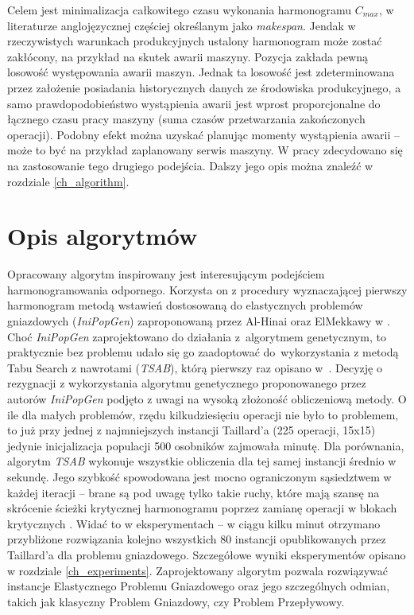 \documentclass[archivemode]{mgr}
\begin{document}
Celem jest minimalizacja całkowitego czasu wykonania harmonogramu $C_{max}$, w literaturze anglojęzycznej częściej określanym jako \emph{makespan}. Jendak w rzeczywistych warunkach produkcyjnych ustalony harmonogram może zostać zakłócony, na przykład na skutek awarii maszyny. Pozycja \cite{RFJSRMB_ElMekkawy11} zakłada pewną losowość występowania awarii maszyn. Jednak ta losowość jest zdeterminowana przez założenie posiadania historycznych danych ze środowiska produkcyjnego, a samo prawdopodobieństwo wystąpienia awarii jest wprost proporcjonalne do łącznego czasu pracy maszyny (suma czasów przetwarzania zakończonych operacji). Podobny efekt można uzyskać planując momenty wystąpienia awarii -- może to być na przykład zaplanowany serwis maszyny. W pracy zdecydowano się na zastosowanie tego drugiego podejścia. Dalszy jego opis można znaleźć w rozdziale \ref{ch_algorithm}.
%
\chapter{Opis algorytmów \label{ch_algorithm}}
Opracowany algorytm inspirowany jest interesującym podejściem harmonogramowania odpornego. Korzysta on z procedury wyznaczającej pierwszy harmonogram metodą wstawień dostosowaną do elastycznych problemów gniazdowych (\emph{IniPopGen}) zaproponowaną przez Al-Hinai oraz ElMekkawy w \cite{AEHGAFJS_ElMekkawy11}. Choć \emph{IniPopGen} zaprojektowano do działania z~algorytmem genetycznym, to praktycznie bez problemu udało się go zaadoptować do~wykorzystania z metodą Tabu Search z nawrotami (\emph{TSAB}), którą pierwszy raz opisano w~\cite{Smutnicki96}. Decyzję o rezygnacji z wykorzystania algorytmu genetycznego proponowanego przez autorów \emph{IniPopGen} podjęto z uwagi na wysoką złożoność obliczeniową metody. O ile dla małych problemów, rzędu kilkudziesięciu operacji nie było to problemem, to już przy jednej z najmniejszych instancji Taillard'a (225 operacji, 15x15) jedynie inicjalizacja populacji 500 osobników zajmowała minutę. Dla porównania, algorytm \emph{TSAB} wykonuje wszystkie obliczenia dla tej samej instancji średnio w sekundę. Jego szybkość spowodowana jest mocno ograniczonym sąsiedztwem w każdej iteracji -- brane są pod uwagę tylko takie ruchy, które mają szansę na skrócenie ścieżki krytycznej harmonogramu poprzez zamianę operacji w blokach krytycznych \cite{Grabowski86}. Widać to w eksperymentach -- w ciągu kilku minut otrzymano przybliżone rozwiązania kolejno wszystkich 80 instancji opublikowanych przez Taillard'a dla problemu gniazdowego. Szczegółowe wyniki eksperymentów opisano w rozdziale \ref{ch_experiments}. Zaprojektowany algorytm pozwala rozwiązywać instancje Elastycznego Problemu Gniazdowego oraz jego szczególnych odmian, takich jak klasyczny Problem Gniazdowy, czy Problem Przepływowy.
%
\end{document}
